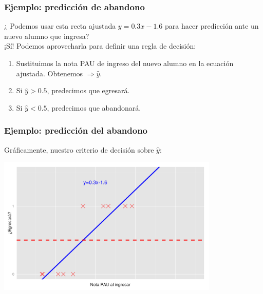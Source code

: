 \documentclass{beamer}
\begin{document}
 \begin{frame}\frametitle{Ejemplo: predicción de abandono}
   \begin{overlayarea}{\textwidth}{\textheight}  
     ¿ Podemos usar esta recta ajustada $y=0.3x-1.6$ para hacer predicción ante un nuevo alumno que ingresa?  \\
     \onslide<+-> ¡Sí! Podemos aprovecharla para definir una regla de decisión:
     \begin{enumerate}
     \item<+-> Sustituimos la nota PAU de ingreso del nuevo alumno en la ecuación ajustada. Obtenemos $\Rightarrow \hat y$.
     \item<+-> Si $\hat y> 0.5$, predecimos que egresará.
     \item<+-> Si $\hat y< 0.5$, predecimos que abandonará.
     \end{enumerate}
   \end{overlayarea}
 \end{frame}
 \begin{frame}\frametitle{Ejemplo: predicción del abandono}
   \begin{overlayarea}{\textwidth}{0.6cm}
   Gráficamente, nuestro criterio de decisión sobre $\hat{y}$: 
 \end{overlayarea}
 \begin{center}
  \includegraphics[height=6.6cm]{egresara4.png}
\end{center}
  \end{frame}
  
\end{document}
